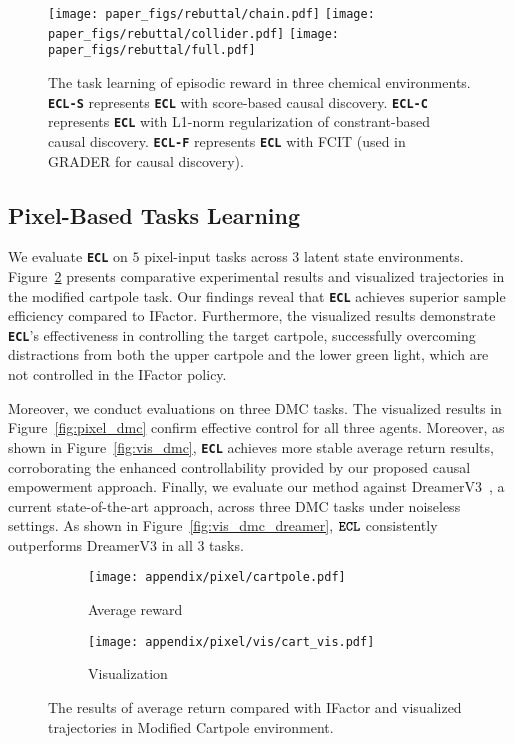 \begin{figure}[t]
\centering
\texttt{[image: paper\_figs/rebuttal/chain.pdf]}
\texttt{[image: paper\_figs/rebuttal/collider.pdf]}
\texttt{[image: paper\_figs/rebuttal/full.pdf]}
\caption{The task learning of episodic reward in three chemical environments. \texttt{\textbf{ECL-S}} represents \texttt{\textbf{ECL}} with score-based causal discovery. \texttt{\textbf{ECL-C}} represents \texttt{\textbf{ECL}} with L1-norm regularization of constrant-based causal discovery. \texttt{\textbf{ECL-F}} represents \texttt{\textbf{ECL}} with FCIT (used in GRADER for causal discovery).}
\label{fig:rebuttal}
\end{figure}


\subsection{Pixel-Based Tasks Learning}
\label{pixel-based results}
We evaluate \texttt{\textbf{ECL}} on $5$ pixel-input tasks across $3$ latent state environments. Figure~\ref{fig:pixel_cartpole} presents comparative experimental results and visualized trajectories in the modified cartpole task. Our findings reveal that \texttt{\textbf{ECL}} achieves superior sample efficiency compared to IFactor. Furthermore, the visualized results demonstrate \texttt{\textbf{ECL}}'s effectiveness in controlling the target cartpole, successfully overcoming distractions from both the upper cartpole and the lower green light, which are not controlled in the IFactor policy. 

Moreover, we conduct evaluations on three DMC tasks. The visualized results in Figure~\ref{fig:pixel_dmc} confirm effective control for all three agents. Moreover, as shown in Figure~\ref{fig:vis_dmc}, \texttt{\textbf{ECL}} achieves more stable average return results, corroborating the enhanced controllability provided by our proposed causal empowerment approach. 
Finally, we evaluate our method against DreamerV3~\citep{hafner2023mastering}, a current state-of-the-art approach, across three DMC tasks under noiseless settings. As shown in Figure~\ref{fig:vis_dmc_dreamer}, $\texttt{\textbf{ECL}}$ consistently outperforms DreamerV3 in all $3$ tasks.

\begin{figure}[h]
    \centering

\begin{subfigure}{0.36\linewidth}
\texttt{[image: appendix/pixel/cartpole.pdf]}
\caption{Average reward}
\end{subfigure}
\hfill
\begin{subfigure}{0.58\linewidth}
\texttt{[image: appendix/pixel/vis/cart\_vis.pdf]}
\caption{Visualization}
\end{subfigure}
\hfill
   \caption{The results of average return compared with IFactor and visualized trajectories in Modified Cartpole environment.}
\label{fig:pixel_cartpole}
\end{figure}



